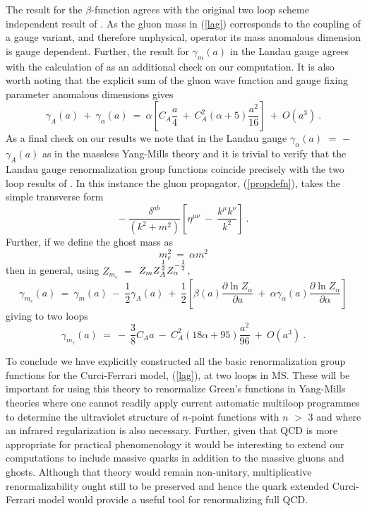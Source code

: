 \documentclass[a4paper,11pt]{article}
\newcommand{\half}{\mbox{\small{$\frac{1}{2}$}}}
\newcommand{\MSbar}{\overline{\mbox{MS}}}
\begin{document}
The result for the $\beta$-function agrees with the original two loop scheme
independent result of \cite{25,26}. As the gluon mass in (\ref{lag}) 
corresponds to the coupling of a gauge variant, and therefore unphysical, 
operator its mass anomalous dimension is gauge dependent. Further, the result 
for $\gamma_m(a)$ in the Landau gauge agrees with the calculation of \cite{7}
as an additional check on our computation. It is also worth noting that the 
explicit sum of the gluon wave function and gauge fixing parameter anomalous
dimensions gives  
\begin{equation} 
\gamma_A(a) ~+~ \gamma_\alpha(a) ~=~ \alpha \left[ C_A \frac{a}{4} ~+~ C_A^2 
\left( \alpha + 5 \right) \frac{a^2}{16} \right] ~+~ O(a^3) ~.  
\end{equation} 
As a final check on our results we note that in the Landau gauge 
$\gamma_\alpha(a)$ $=$ $-$ $\gamma_A(a)$ as in the massless Yang-Mills theory
and it is trivial to verify that the Landau gauge renormalization group 
functions coincide precisely with the two loop results of \cite{25,26,27,22}. 
In this instance the gluon propagator, 
(\ref{propdefn}), takes the simple transverse form  
\begin{equation} 
-~ \frac{\delta^{ab}}{(k^2+m^2)} \left[ \eta^{\mu\nu} ~-~ \frac{k^\mu k^\nu}
{k^2} \right] ~.  
\end{equation} 
Further, if we define the ghost mass as   
\begin{equation} 
m^2_c ~=~ \alpha m^2 
\end{equation} 
then in general, using $Z_{m_c}$ $=$ $Z_m Z^{\half}_A Z_\alpha^{-\half}$,  
\begin{equation} 
\gamma_{m_c}(a) ~=~ \gamma_m(a) ~-~ \frac{1}{2} \gamma_A(a) ~+~ 
\frac{1}{2} \left[ \beta(a) \frac{\partial \ln Z_\alpha}{\partial a} ~+~
\alpha \gamma_\alpha(a) \frac{\partial \ln Z_\alpha}{\partial \alpha} \right] 
\end{equation}  
giving to two loops 
\begin{equation} 
\gamma_{m_c}(a) ~=~ -~ \frac{3}{8} C_A a ~-~ C_A^2 \left( 18 \alpha + 95 
\right) \frac{a^2}{96} ~+~ O(a^3) ~.  
\end{equation} 

To conclude we have explicitly constructed all the basic renormalization group
functions for the Curci-Ferrari model, (\ref{lag}), at two loops in $\MSbar$. 
These will be important for using this theory to renormalize Green's functions 
in Yang-Mills theories where one cannot readily apply current automatic 
multiloop programmes to determine the ultraviolet structure of $n$-point 
functions with $n$ $>$ $3$ and where an infrared regularization is also 
necessary. Further, given that QCD is more appropriate for practical 
phenomenology it would be interesting to extend our computations to include 
massive quarks in addition to the massive gluons and ghosts. Although that 
theory would remain non-unitary, multiplicative renormalizability ought still 
to be preserved and hence the quark extended Curci-Ferrari model would provide 
a useful tool for renormalizing full QCD.  
\end{document}
